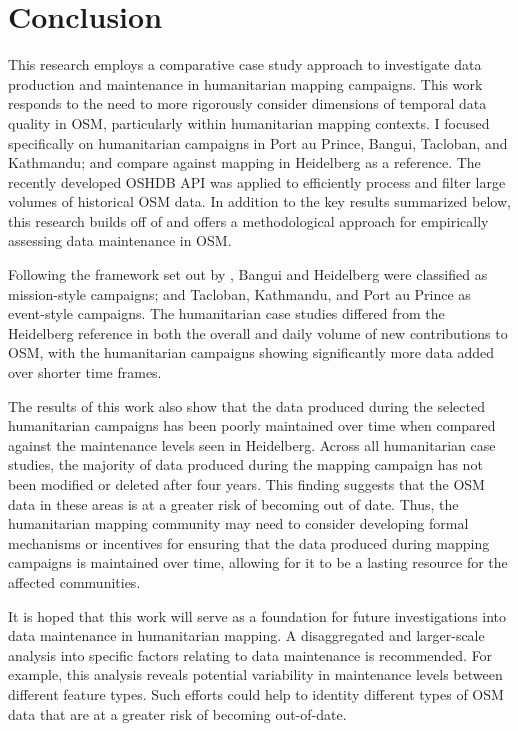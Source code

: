 \chapter{Conclusion}
\label{chapterlabel7}

This research employs a comparative case study approach to investigate data production and maintenance in humanitarian mapping campaigns. This work responds to the need to more rigorously consider dimensions of temporal data quality in OSM, particularly within humanitarian mapping contexts. I focused specifically on humanitarian campaigns in Port au Prince, Bangui, Tacloban, and Kathmandu; and compare against mapping in Heidelberg as a reference. The recently developed OSHDB API was applied to efficiently process and filter large volumes of historical OSM data. In addition to the key results summarized below, this research builds off of \textcite{quattrone_work_2017} and offers a methodological approach for empirically assessing data maintenance in OSM.  

Following the framework set out by \textcite{dittus_mass_2017}, Bangui and Heidelberg were classified as mission-style campaigns; and Tacloban, Kathmandu, and Port au Prince as event-style campaigns. The humanitarian case studies differed from the Heidelberg reference in both the overall and daily volume of new contributions to OSM, with the humanitarian campaigns showing significantly more data added over shorter time frames. 

The results of this work also show that the data produced during the selected humanitarian campaigns has been poorly maintained over time when compared against the maintenance levels seen in Heidelberg. Across all humanitarian case studies, the majority of data produced during the mapping campaign has not been modified or deleted after four years. This finding suggests that the OSM data in these areas is at a greater risk of becoming out of date. Thus, the humanitarian mapping community may need to consider developing formal mechanisms or incentives for ensuring that the data produced during mapping campaigns is maintained over time, allowing for it to be a lasting resource for the affected communities. 

It is hoped that this work will serve as a foundation for future investigations into data maintenance in humanitarian mapping. A disaggregated and larger-scale analysis into specific factors relating to data maintenance is recommended. For example, this analysis reveals potential variability in maintenance levels between different feature types. Such efforts could help to identity different types of OSM data that are at a greater risk of becoming out-of-date. 

